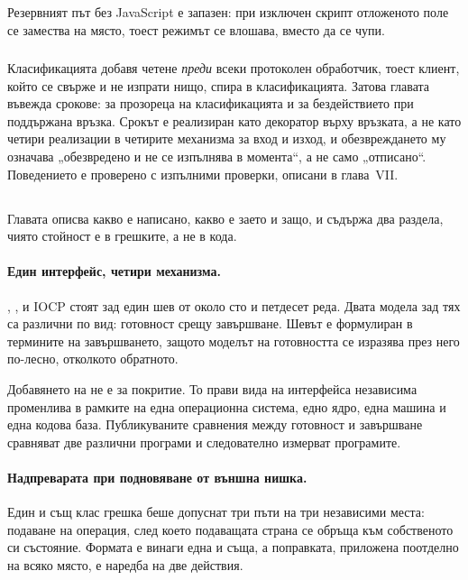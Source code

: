 Резервният път без JavaScript е запазен: при изключен скрипт отложеното поле се замества на
място, тоест режимът се влошава, вместо да се чупи.

\subsubsection*{}

Класификацията добавя четене \emph{преди} всеки протоколен обработчик, тоест клиент, който се
свърже и не изпрати нищо, спира в класификацията. Затова главата въвежда срокове: за
прозореца на класификацията и за бездействието при поддържана връзка. Срокът е реализиран
като декоратор върху връзката, а не като четири реализации в четирите механизма за вход и
изход, и обезвреждането му означава „обезвредено и не се изпълнява в момента“, а не само
„отписано“. Поведението е проверено с изпълними проверки, описани в глава~VII.

\subsection*{}

Главата описва какво е написано, какво е заето и защо, и съдържа два раздела, чиято стойност
е в грешките, а не в кода.

\paragraph{Един интерфейс, четири механизма.} , ,  и
IOCP стоят зад един шев от около сто и петдесет реда. Двата модела зад тях са различни по вид:
готовност срещу завършване. Шевът е формулиран в термините на завършването, защото моделът на
готовността се изразява през него по-лесно, отколкото обратното.

Добавянето на  не е за покритие. То прави вида на интерфейса независима променлива
в рамките на една операционна система, едно ядро, една машина и една кодова база.
Публикуваните сравнения между готовност и завършване сравняват две различни програми и
следователно измерват програмите.

\paragraph{Надпреварата при подновяване от външна нишка.} Един и същ клас грешка беше допуснат
три пъти на три независими места: подаване на операция, след което подаващата страна се
обръща към собственото си състояние. Формата е винаги една и съща, а поправката, приложена
поотделно на всяко място, е наредба на две действия.

